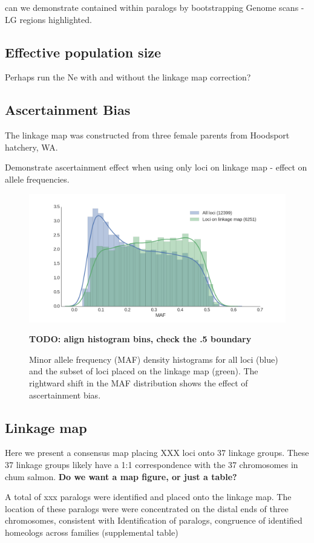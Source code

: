 \documentclass[12pt,  one column]{article}
\begin{document}
can we demonstrate contained within paralogs by bootstrapping 
Genome scans - LG regions highlighted.

\subsection*{Effective population size}


Perhaps run the Ne with and without the linkage map correction?

\subsection*{Ascertainment Bias}
The linkage map was constructed from three female parents from Hoodsport hatchery, WA.

Demonstrate ascertainment effect when using only loci on linkage map - effect on allele frequencies.

\begin{figure}[H]
\includegraphics[scale=.3]{figures/supplemental/ascertainment.png}
\caption{Minor allele frequency (MAF) density histograms for all loci (blue) and the subset of loci placed on the linkage map (green). The rightward shift in the MAF distribution shows the effect of ascertainment bias.} \textbf{TODO: align histogram bins, check the .5 boundary}
\end{figure}

\subsection*{Linkage map}
Here we present a consensus map placing XXX loci onto 37 linkage groups.  These 37 linkage groups likely have a 1:1 correspondence with the 37 chromosomes in chum salmon. \textbf{Do we want a map figure, or just a table?}

A total of xxx paralogs were identified and placed onto the linkage map.  The location of these paralogs were were concentrated on the distal ends of three chromosomes, consistent with Identification of paralogs, congruence of identified homeologs across families (supplemental table)
\end{document}
